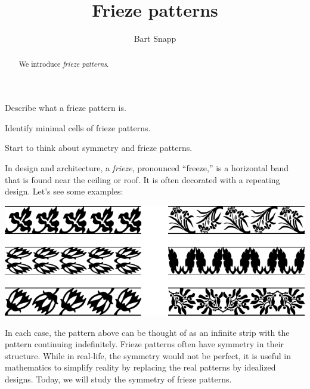 \documentclass[noauthor,nooutcomes,hints,handout]{../ximera}
\author{Bart Snapp}
\title{Frieze patterns}
\begin{document}
\begin{abstract}
  We introduce \emph{frieze patterns}.
\end{abstract}
\maketitle

\begin{listOutcomes}
\item Describe what a frieze pattern is.
\item Identify minimal cells of frieze patterns.
\item Start to think about symmetry and frieze patterns.
\end{listOutcomes}

In design and architecture, a \emph{frieze},
pronounced ``freeze,'' is a horizontal band that is found near the
ceiling or roof. It is often decorated with a repeating design. Let's
see some examples:
\begin{center}
\includegraphics[width=.6\textwidth]{fpfrieze.pdf}
\end{center}
In each case, the pattern above can be thought of as an infinite strip
with the pattern continuing indefinitely.  Frieze patterns often have
symmetry in their structure. While in real-life, the symmetry would
not be perfect, it is useful in mathematics to simplify reality by
replacing the real patterns by idealized designs.  Today, we will
study the symmetry of frieze patterns.
\end{document}
